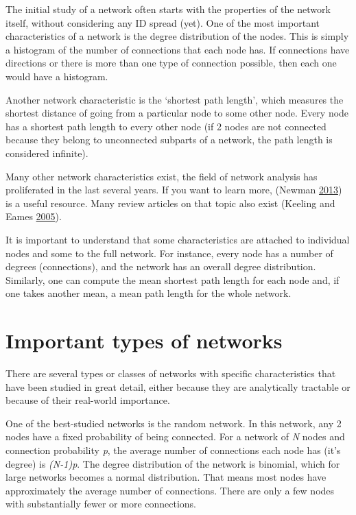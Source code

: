 \documentclass[]{book}
\theoremstyle{definition}
\theoremstyle{definition}
\theoremstyle{definition}
\theoremstyle{remark}
\begin{document}
The initial study of a network often starts with the properties of the
network itself, without considering any ID spread (yet). One of the most
important characteristics of a network is the degree distribution of the
nodes. This is simply a histogram of the number of connections that each
node has. If connections have directions or there is more than one type
of connection possible, then each one would have a histogram.

Another network characteristic is the `shortest path length', which
measures the shortest distance of going from a particular node to some
other node. Every node has a shortest path length to every other node
(if 2 nodes are not connected because they belong to unconnected
subparts of a network, the path length is considered infinite).

Many other network characteristics exist, the field of network analysis
has proliferated in the last several years. If you want to learn more,
(Newman \protect\hyperlink{ref-newman13}{2013}) is a useful resource.
Many review articles on that topic also exist (Keeling and Eames
\protect\hyperlink{ref-keeling05}{2005}).

It is important to understand that some characteristics are attached to
individual nodes and some to the full network. For instance, every node
has a number of degrees (connections), and the network has an overall
degree distribution. Similarly, one can compute the mean shortest path
length for each node and, if one takes another mean, a mean path length
for the whole network.

\section{Important types of networks}\label{important-types-of-networks}

There are several types or classes of networks with specific
characteristics that have been studied in great detail, either because
they are analytically tractable or because of their real-world
importance.

One of the best-studied networks is the random network. In this network,
any 2 nodes have a fixed probability of being connected. For a network
of \emph{N} nodes and connection probability \emph{p}, the average
number of connections each node has (it's degree) is \emph{(N-1)p}. The
degree distribution of the network is binomial, which for large networks
becomes a normal distribution. That means most nodes have approximately
the average number of connections. There are only a few nodes with
substantially fewer or more connections.
\end{document}
